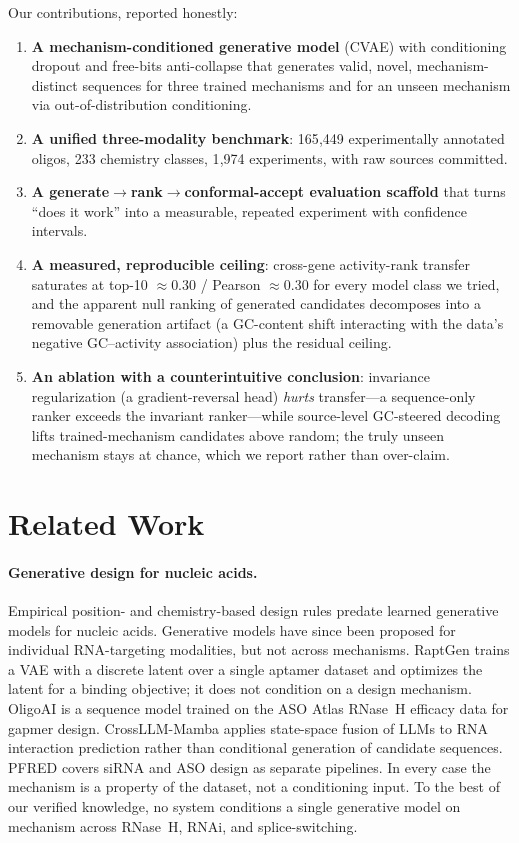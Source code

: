 \documentclass{article} %
\begin{document}
Our contributions, reported honestly:
\begin{enumerate}
\item \textbf{A mechanism-conditioned generative model} (CVAE) \citep{kingma2014} with conditioning dropout and free-bits anti-collapse \citep{kingma2016} that generates valid, novel, mechanism-distinct sequences for three trained mechanisms and for an unseen mechanism via out-of-distribution conditioning.
\item \textbf{A unified three-modality benchmark}: 165{,}449 experimentally annotated oligos, 233 chemistry classes, 1{,}974 experiments, with raw sources committed.
\item \textbf{A generate$\rightarrow$rank$\rightarrow$conformal-accept evaluation scaffold} that turns ``does it work'' into a measurable, repeated experiment with confidence intervals.
\item \textbf{A measured, reproducible ceiling}: cross-gene activity-rank transfer saturates at top-10 $\approx 0.30$ / Pearson $\approx 0.30$ for every model class we tried, and the apparent null ranking of generated candidates decomposes into a removable generation artifact (a GC-content shift interacting with the data's negative GC--activity association) plus the residual ceiling.
\item \textbf{An ablation with a counterintuitive conclusion}: invariance regularization (a gradient-reversal head) \emph{hurts} transfer---a sequence-only ranker exceeds the invariant ranker---while source-level GC-steered decoding lifts trained-mechanism candidates above random; the truly unseen mechanism stays at chance, which we report rather than over-claim.
\end{enumerate}

\section{Related Work}

\paragraph{Generative design for nucleic acids.}
Empirical position- and chemistry-based design rules \citep{huesken2005,reynolds2004} predate learned generative models for nucleic acids. Generative models have since been proposed for individual RNA-targeting modalities, but not across mechanisms. RaptGen \citep{iwano2022} trains a VAE with a discrete latent over a single aptamer dataset and optimizes the latent for a binding objective; it does not condition on a design mechanism. OligoAI \citep{hill2025} is a sequence model trained on the ASO Atlas RNase~H efficacy data for gapmer design. CrossLLM-Mamba \citep{sadia2026} applies state-space fusion of LLMs to RNA interaction prediction rather than conditional generation of candidate sequences. PFRED \citep{sciabola2021} covers siRNA and ASO design as separate pipelines. In every case the mechanism is a property of the dataset, not a conditioning input. To the best of our verified knowledge, no system conditions a single generative model on mechanism across RNase~H, RNAi, and splice-switching.
\end{document}
